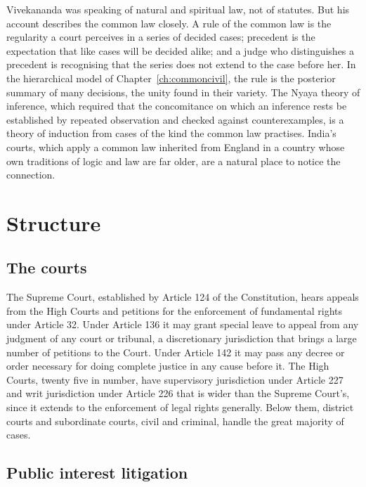 Vivekananda was speaking of natural and spiritual law, not of statutes. But his account describes the common law closely. A rule of the common law is the regularity a court perceives in a series of decided cases; precedent is the expectation that like cases will be decided alike; and a judge who distinguishes a precedent is recognising that the series does not extend to the case before her. In the hierarchical model of Chapter~\ref{ch:commoncivil}, the rule is the posterior summary of many decisions, the unity found in their variety. The Nyaya theory of inference, which required that the concomitance on which an inference rests be established by repeated observation and checked against counterexamples, is a theory of induction from cases of the kind the common law practises. India's courts, which apply a common law inherited from England in a country whose own traditions of logic and law are far older, are a natural place to notice the connection.

\section{Structure}

\subsection{The courts}

The Supreme Court, established by Article 124 of the Constitution, hears appeals from the High Courts and petitions for the enforcement of fundamental rights under Article 32. Under Article 136 it may grant special leave to appeal from any judgment of any court or tribunal, a discretionary jurisdiction that brings a large number of petitions to the Court. Under Article 142 it may pass any decree or order necessary for doing complete justice in any cause before it. The High Courts, twenty five in number, have supervisory jurisdiction under Article 227 and writ jurisdiction under Article 226 that is wider than the Supreme Court's, since it extends to the enforcement of legal rights generally. Below them, district courts and subordinate courts, civil and criminal, handle the great majority of cases.

\subsection{Public interest litigation}

